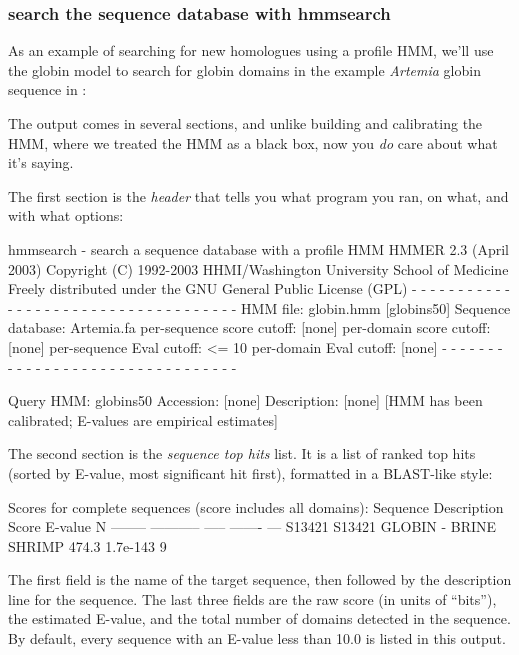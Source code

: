\subsubsection{search the sequence database with hmmsearch}

As an example of searching for new homologues using a profile HMM,
we'll use the globin model to search for globin domains in the example
\emph{ Artemia} globin sequence in :


The output comes in several sections, and unlike building and
calibrating the HMM, where we treated the HMM as a black box, now you
\emph{do} care about what it's saying.

The first section is the \emph{header} that tells you what program you
ran, on what, and with what options:

\begin{sreoutput}
hmmsearch - search a sequence database with a profile HMM
HMMER 2.3 (April 2003)
Copyright (C) 1992-2003 HHMI/Washington University School of Medicine
Freely distributed under the GNU General Public License (GPL)
- - - - - - - - - - - - - - - - - - - - - - - - - - - - - - - - - - - -
HMM file:                   globin.hmm [globins50]
Sequence database:          Artemia.fa
per-sequence score cutoff:  [none]
per-domain score cutoff:    [none]
per-sequence Eval cutoff:   <= 10        
per-domain Eval cutoff:     [none]
- - - - - - - - - - - - - - - - - - - - - - - - - - - - - - - -

Query HMM:   globins50
Accession:   [none]
Description: [none]
  [HMM has been calibrated; E-values are empirical estimates]
\end{sreoutput}

The second section is the \emph{ sequence top hits} list. It is a list
of ranked top hits (sorted by E-value, most significant hit first),
formatted in a BLAST-like style:

\begin{sreoutput}
Scores for complete sequences (score includes all domains):
Sequence Description                                    Score    E-value  N 
-------- -----------                                    -----    ------- ---
S13421   S13421 GLOBIN - BRINE SHRIMP                   474.3   1.7e-143   9
\end{sreoutput}

The first field is the name of the target sequence, then followed by
the description line for the sequence. The last three fields are the
raw score (in units of ``bits''), the estimated E-value, and the total
number of domains detected in the sequence.  By default, every
sequence with an E-value less than 10.0 is listed in this output.

